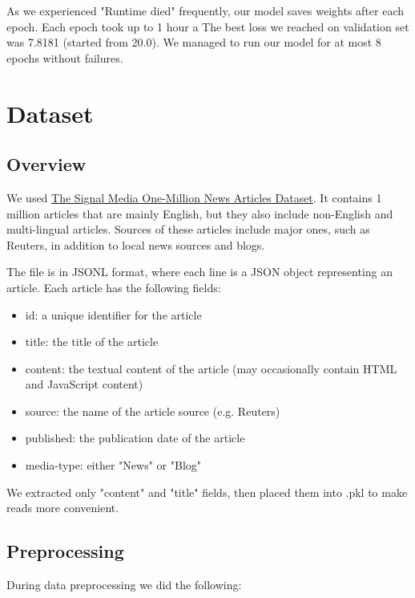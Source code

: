 As we experienced "Runtime died" frequently, our model saves weights after each epoch. Each epoch took up to 1 hour a The best loss we reached on validation set was 7.8181 (started from 20.0). We managed to run our model for at most 8 epochs without failures.

\section{Dataset}
\subsection{Overview}
We used \href{http://research.signalmedia.co/newsir16/signal-dataset.html}{The Signal Media One-Million News Articles Dataset}. It contains 1 million articles that are mainly English, but they also include non-English and multi-lingual articles. Sources of these articles include major ones, such as Reuters, in addition to local news sources and blogs.

The file is in JSONL format, where each line is a JSON object representing an article. Each article has the following fields:

\begin{itemize}
\setlength\itemsep{-0.5em}
\item id: a unique identifier for the article
\item title: the title of the article
\item content: the textual content of the article (may occasionally contain HTML and JavaScript content)
\item source: the name of the article source (e.g. Reuters)
\item published: the publication date of the article
\item media-type: either "News" or "Blog"
\end{itemize}  

We extracted only "content" and "title" fields, then placed them into .pkl to make reads more convenient.

\subsection{Preprocessing}
During data preprocessing we did the following:

